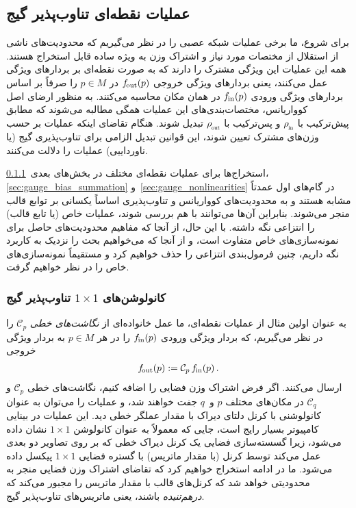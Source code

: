 

\subsection{عملیات نقطه‌ای تناوب‌پذیر گیج}
\label{sec:pointwise_operations}


برای شروع، ما برخی عملیات شبکه عصبی را در نظر می‌گیریم که محدودیت‌های ناشی از استقلال از مختصات مورد نیاز و اشتراک وزن به ویژه ساده قابل استخراج هستند.
همه این عملیات این ویژگی مشترک را دارند که به صورت نقطه‌ای بر بردارهای ویژگی عمل می‌کنند، یعنی بردارهای ویژگی خروجی $f_\textup{\:\!\!out}(p)$ در $p\in M$ را صرفاً بر اساس بردارهای ویژگی ورودی $f_\textup{\;\!\!in}(p)$ در همان مکان محاسبه می‌کنند.
به منظور ارضای اصل کوواریانس، مختصات‌بندی‌های این عملیات همگی مطالبه می‌شوند که مطابق پیش‌ترکیب با $\rhoin$ و پس‌ترکیب با $\rhoout$ تبدیل شوند.
هنگام تقاضای اینکه عملیات بر حسب وزن‌های مشترک تعیین شوند، این قوانین تبدیل الزامی برای تناوب‌پذیری گیج (یا ناورداییی) عملیات را دلالت می‌کنند.


استخراج‌ها برای عملیات نقطه‌ای مختلف در بخش‌های بعدی~\ref{sec:gauge_1x1}، \ref{sec:gauge_bias_summation} و~\ref{sec:gauge_nonlinearities} در گام‌های اول عمدتاً مشابه هستند و به محدودیت‌های کوواریانس و تناوب‌پذیری اساساً یکسانی بر توابع قالب منجر می‌شوند.
بنابراین آن‌ها می‌توانند با هم بررسی شوند، عملیات خاص (یا تابع قالب) را انتزاعی نگه داشته.
با این حال، از آنجا که مفاهیم محدودیت‌های حاصل برای نمونه‌سازی‌های خاص متفاوت است، و از آنجا که می‌خواهیم بحث را نزدیک به کاربرد نگه داریم، چنین فرمول‌بندی انتزاعی را حذف خواهیم کرد و مستقیماً نمونه‌سازی‌های خاص را در نظر خواهیم گرفت.


\subsubsection{کانولوشن‌های $1\times1$ تناوب‌پذیر گیج}
\label{sec:gauge_1x1}


به عنوان اولین مثال از عملیات نقطه‌ای، ما عمل خانواده‌ای از \emph{نگاشت‌های خطی} $\mathcal{C}_p$ را در نظر می‌گیریم، که بردار ویژگی ورودی $f_\textup{\;\!\!in}(p)$ را در هر $p\in M$ به بردار ویژگی خروجی
\begin{align}
	f_\textup{\:\!\!out}(p) := \mathcal{C}_p\, f_\textup{\;\!\!in}(p) \,.
\end{align}
ارسال می‌کنند.
اگر فرض اشتراک وزن فضایی را اضافه کنیم، نگاشت‌های خطی $\mathcal{C}_p$ و $\mathcal{C}_q$ در مکان‌های مختلف $p$ و~$q$ جفت خواهند شد، و عملیات را می‌توان به عنوان کانولوشنی با کرنل دلتای دیراک با مقدار عملگر خطی دید.
این عملیات در بینایی کامپیوتر بسیار رایج است، جایی که معمولاً به عنوان کانولوشن $1\times1$ نشان داده می‌شود، زیرا گسسته‌سازی فضایی یک کرنل دیراک خطی که بر روی تصاویر دو بعدی عمل می‌کند توسط کرنل (با مقدار ماتریس) با گستره فضایی $1\times1$ پیکسل داده می‌شود.
ما در ادامه استخراج خواهیم کرد که تقاضای اشتراک وزن فضایی منجر به محدودیتی خواهد شد که کرنل‌های قالب با مقدار ماتریس را مجبور می‌کند که \emph{درهم‌تنیده} باشند، یعنی ماتریس‌های تناوب‌پذیر گیج.



